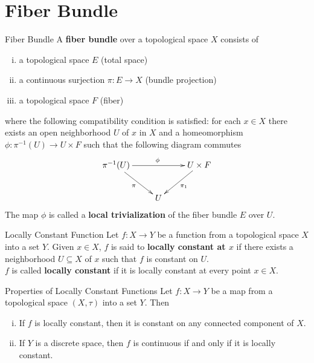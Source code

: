 \documentclass{report}
\begin{document}
\section{Fiber Bundle}
\begin{definition}{Fiber Bundle}{}
	A \textbf{fiber bundle} over a topological space $X$ consists of
	\begin{enumerate}[(i)]
		 \item a topological space $E$ (total space)
		 \item a continuous surjection $\pi:E\to X$ (bundle projection)
		 \item a topological space $F$ (fiber)
	\end{enumerate}
	where the following compatibility condition is satisfied: for each $x\in X$ there exists an open neighborhood $U$ of $x$ in $X$ and a homeomorphism $\phi:\pi^{-1}(U)\to U\times F$ such that
	the following diagram commutes
		\[\xymatrix{
			\pi^{-1}(U)\ar[rd]_{\pi}\ar[rr]^{\phi}  & &U\times F\ar[ld]^{\pi_1}\\
			&U&
			}\]
	The map $\phi$ is called a \textbf{local trivialization} of the fiber bundle $E$ over $U$.
\end{definition}

\begin{definition}{Locally Constant Function}{}
	Let $f: X \to Y$ be a function from a topological space $X$ into a set $Y$. Given $x \in X$, $f$ is said to \textbf{locally constant at $x$} if there exists a neighborhood $U \subseteq X$ of $x$ such that $f$ is constant on $U$.\\
	$f$ is called \textbf{locally constant} if it is locally constant at every point $x \in X$.
\end{definition}

\begin{proposition}{Properties of Locally Constant Functions}{}
	Let $f: X \to Y$ be a map from a topological space $(X,\tau)$ into a set $Y$. Then
	\begin{enumerate}[(i)]
		\item If $f$ is locally constant, then it is constant on any connected component of $X$.
		\item If $Y$ is a discrete space, then $f$ is continuous if and only if it is locally constant.
	\end{enumerate}
\end{proposition}
\end{document}
